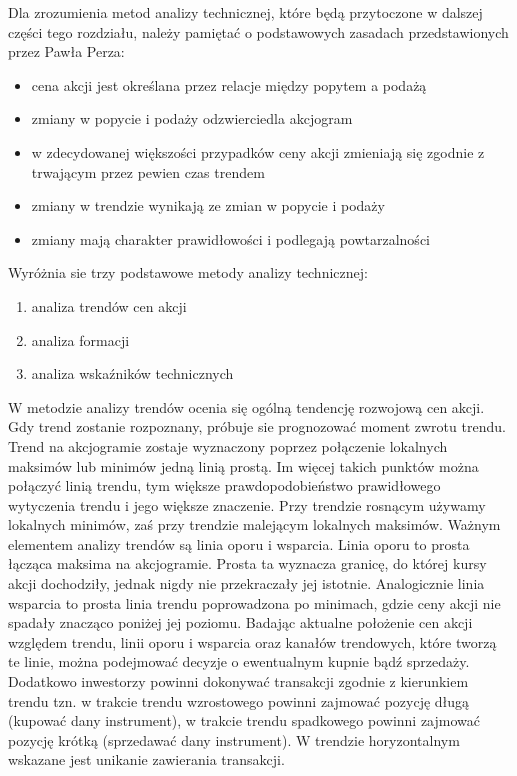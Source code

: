 \documentclass[pdflatex,11pt]{aghdpl}
\begin{document}
Dla zrozumienia metod analizy technicznej, które będą przytoczone w dalszej części tego rozdziału, należy pamiętać o podstawowych zasadach przedstawionych przez Pawła Perza:
\begin{itemize}
\item cena akcji jest określana przez relacje między popytem a podażą
\item zmiany w popycie i podaży odzwierciedla akcjogram
\item w zdecydowanej większości przypadków ceny akcji zmieniają się zgodnie z trwającym przez pewien czas trendem
\item zmiany w trendzie wynikają ze zmian w popycie i podaży
\item zmiany mają charakter prawidłowości i podlegają powtarzalności 
\end{itemize}
Wyróżnia sie trzy podstawowe metody analizy technicznej:
\begin{enumerate}
\item analiza trendów cen akcji
\item analiza formacji
\item analiza wskaźników technicznych
\end{enumerate}

W metodzie analizy trendów ocenia się ogólną tendencję rozwojową cen akcji. Gdy trend zostanie rozpoznany, próbuje sie prognozować moment zwrotu trendu\cite{8}. Trend na akcjogramie zostaje wyznaczony poprzez połączenie lokalnych maksimów lub minimów jedną linią prostą. Im więcej takich punktów można połączyć linią trendu, tym większe prawdopodobieństwo prawidłowego wytyczenia trendu i jego większe znaczenie. Przy trendzie rosnącym używamy lokalnych minimów, zaś przy trendzie malejącym lokalnych maksimów. Ważnym elementem analizy trendów są linia oporu i wsparcia. Linia oporu to prosta łącząca maksima na akcjogramie. Prosta ta wyznacza granicę, do której kursy akcji dochodziły, jednak nigdy nie przekraczały jej istotnie. Analogicznie linia wsparcia to prosta linia trendu poprowadzona po minimach, gdzie ceny akcji nie spadały znacząco poniżej jej poziomu. Badając aktualne położenie cen akcji względem trendu, linii oporu i wsparcia oraz kanałów trendowych, które tworzą te linie, można podejmować decyzje o ewentualnym kupnie bądź sprzedaży. Dodatkowo inwestorzy powinni dokonywać transakcji zgodnie z kierunkiem trendu tzn. w trakcie trendu wzrostowego powinni zajmować pozycję długą (kupować dany instrument), w trakcie trendu spadkowego powinni zajmować pozycję krótką (sprzedawać dany instrument). W trendzie horyzontalnym wskazane jest unikanie zawierania transakcji\cite{6}.
\end{document}
